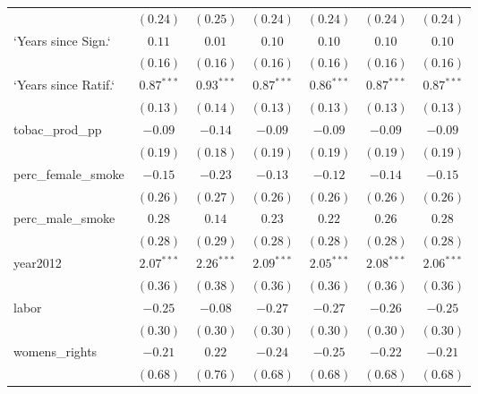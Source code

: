\begin{table}[!h]
\begin{center}
\begin{tabular}{l c c c c c c }
                        & $(0.24)$     & $(0.25)$     & $(0.24)$     & $(0.24)$     & $(0.24)$     & $(0.24)$     \\
`Years since Sign.`     & $0.11$       & $0.01$       & $0.10$       & $0.10$       & $0.10$       & $0.10$       \\
                        & $(0.16)$     & $(0.16)$     & $(0.16)$     & $(0.16)$     & $(0.16)$     & $(0.16)$     \\
`Years since Ratif.`    & $0.87^{***}$ & $0.93^{***}$ & $0.87^{***}$ & $0.86^{***}$ & $0.87^{***}$ & $0.87^{***}$ \\
                        & $(0.13)$     & $(0.14)$     & $(0.13)$     & $(0.13)$     & $(0.13)$     & $(0.13)$     \\
tobac\_prod\_pp         & $-0.09$      & $-0.14$      & $-0.09$      & $-0.09$      & $-0.09$      & $-0.09$      \\
                        & $(0.19)$     & $(0.18)$     & $(0.19)$     & $(0.19)$     & $(0.19)$     & $(0.19)$     \\
perc\_female\_smoke     & $-0.15$      & $-0.23$      & $-0.13$      & $-0.12$      & $-0.14$      & $-0.15$      \\
                        & $(0.26)$     & $(0.27)$     & $(0.26)$     & $(0.26)$     & $(0.26)$     & $(0.26)$     \\
perc\_male\_smoke       & $0.28$       & $0.14$       & $0.23$       & $0.22$       & $0.26$       & $0.28$       \\
                        & $(0.28)$     & $(0.29)$     & $(0.28)$     & $(0.28)$     & $(0.28)$     & $(0.28)$     \\
year2012                & $2.07^{***}$ & $2.26^{***}$ & $2.09^{***}$ & $2.05^{***}$ & $2.08^{***}$ & $2.06^{***}$ \\
                        & $(0.36)$     & $(0.38)$     & $(0.36)$     & $(0.36)$     & $(0.36)$     & $(0.36)$     \\
labor                   & $-0.25$      & $-0.08$      & $-0.27$      & $-0.27$      & $-0.26$      & $-0.25$      \\
                        & $(0.30)$     & $(0.30)$     & $(0.30)$     & $(0.30)$     & $(0.30)$     & $(0.30)$     \\
womens\_rights          & $-0.21$      & $0.22$       & $-0.24$      & $-0.25$      & $-0.22$      & $-0.21$      \\
                        & $(0.68)$     & $(0.76)$     & $(0.68)$     & $(0.68)$     & $(0.68)$     & $(0.68)$     \\

\end{tabular}
\end{center}
\end{table}
